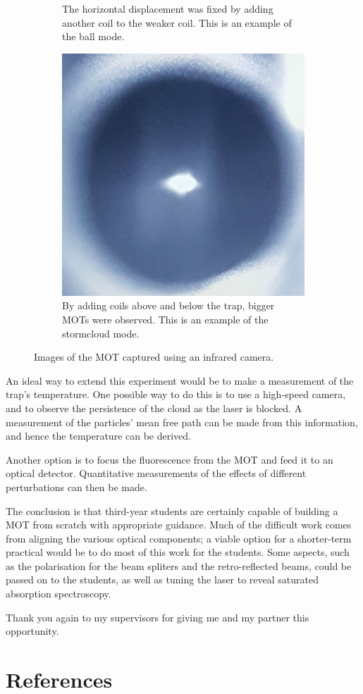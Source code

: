 \documentclass[11pt,twoside,a4paper]{article}
\begin{document}
\begin{figure}[h]
\begin{subfigure}{.3\textwidth}
        \caption{The horizontal displacement was fixed by adding another coil to the weaker coil. This is an example of the ball mode.}
    \end{subfigure}
    \begin{subfigure}{.3\textwidth}
        \centering
        \includegraphics[width=.7\textwidth]{images/success3}
        \caption{By adding coils above and below the trap, bigger MOTs were observed. This is an example of the stormcloud mode.}
    \end{subfigure}

    \caption{Images of the MOT captured using an infrared camera.}
\end{figure}

An ideal way to extend this experiment would be to make a measurement of the trap's temperature. One possible way to do this is to use a high-speed camera, and to observe
the persistence of the cloud as the laser is blocked. A measurement of the particles' mean free path can be made from this information, and hence the temperature can be derived.

Another option is to focus the fluorescence from the MOT and feed it to an optical detector. Quantitative measurements of the effects of different perturbations can then be made.

The conclusion is that third-year students are certainly capable of building a MOT from scratch with appropriate guidance. Much of the difficult work comes from aligning the various
optical components; a viable option for a shorter-term practical would be to do most of this work for the students. Some aspects, such as the polarisation for the beam spliters and
the retro-reflected beams, could be passed on to the students, as well as tuning the laser to reveal saturated absorption spectroscopy.

Thank you again to my supervisors for giving me and my partner this opportunity.
\vfill
\pagebreak
\section{References}


\end{document}
